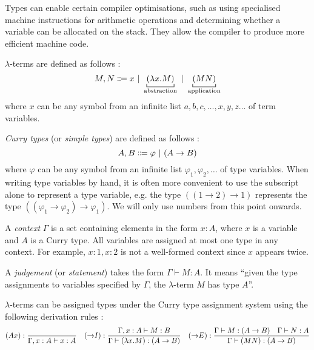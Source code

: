 Types can enable certain compiler optimisations, such as using specialised machine instructions for arithmetic operations and determining whether a variable can be allocated on the stack. They allow the compiler to produce more efficient machine code.
\begin{definition}
    \label{lambda:lambda-terms}
    $\lambda$-terms are defined as follows \cite{church:1941}:
    \[
        M,N \Coloneqq x \alt \underbracket[0.6pt]{(\lambda x. M)}_\text{abstraction} \alt \underbracket[0.6pt]{(MN)}_\text{application}
    \]
    where $x$ can be any symbol from an infinite list $a, b, c, \ldots, x, y, z \ldots$ of term variables.
\end{definition}
\begin{definition}
    \label{lambda:curry-types}
    \textit{Curry types} (or \textit{simple types}) are defined as follows \cite{van-bakel:2022}:
    \[
        A, B \Coloneqq \varphi \ |\  (A \rightarrow B)
    \]
    where $\varphi$ can be any symbol from an infinite list $\varphi_1, \varphi_2, \ldots$ of type variables. When writing type variables by hand, it is often more convenient to use the subscript alone to represent a type variable, e.g. the type $((1 \rightarrow 2) \rightarrow 1)$ represents the type $((\varphi_1 \rightarrow \varphi_2) \rightarrow \varphi_1)$. We will only use numbers from this point onwards.
\end{definition}
\begin{definition}
    A \textit{context} $\Gamma$ is a set containing elements in the form $x:A$, where $x$ is a variable and $A$ is a Curry type. All variables are assigned at most one type in any context. For example, $x:1, x:2$ is not a well-formed context since $x$ appears twice.
\end{definition}
\begin{definition}
    A \textit{judgement} (or \textit{statement}) takes the form $\Gamma \vdash M: A$. It means ``given the type assignments to variables specified by $\Gamma$, the $\lambda$-term $M$ has type $A$''.
\end{definition}
\begin{definition}
    \label{lambda:type-assignment}
    $\lambda$-terms can be assigned types under the Curry type assignment system using the following derivation rules \cite{van-bakel:2022}:
    {
        \derivationfont
        \[
            (Ax): \frac{}{\Gamma, x:A \vdash x:A} \quad (\mathord{\to} I): \frac{\Gamma, x:A \vdash M:B}{\Gamma \vdash (\lambda x. M): (A \to B)} \quad (\mathord{\to} E): \frac{\Gamma \vdash M: (A \to B) \quad \Gamma \vdash N: A}{\Gamma \vdash (MN): (A \to B)}
        \]
    }%
\end{definition}

